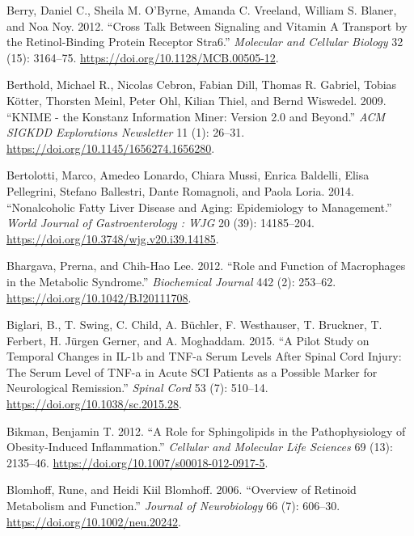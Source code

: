 \documentclass[9pt,lineno]{elife}
\newlength{\cslhangindent}
\newlength{\cslentryspacingunit} %
\newenvironment{CSLReferences}[2] %
 {%
  \setlength{\parindent}{0pt}
  \ifodd #1
  \let\oldpar\par
  \def\par{\hangindent=\cslhangindent\oldpar}
  \fi
  \setlength{\parskip}{#2\cslentryspacingunit}
 }%
 {}
\begin{document}
\begin{CSLReferences}{1}{0}
\leavevmode{}%
Berry, Daniel C., Sheila M. O'Byrne, Amanda C. Vreeland, William S. Blaner, and Noa Noy. 2012. {``Cross {Talk} Between {Signaling} and {Vitamin A Transport} by the {Retinol-Binding Protein Receptor Stra6}.''} \emph{Molecular and Cellular Biology} 32 (15): 3164--75. \url{https://doi.org/10.1128/MCB.00505-12}.

\leavevmode{}%
Berthold, Michael R., Nicolas Cebron, Fabian Dill, Thomas R. Gabriel, Tobias Kötter, Thorsten Meinl, Peter Ohl, Kilian Thiel, and Bernd Wiswedel. 2009. {``{KNIME} - the {Konstanz} Information Miner: Version 2.0 and Beyond.''} \emph{ACM SIGKDD Explorations Newsletter} 11 (1): 26--31. \url{https://doi.org/10.1145/1656274.1656280}.

\leavevmode{}%
Bertolotti, Marco, Amedeo Lonardo, Chiara Mussi, Enrica Baldelli, Elisa Pellegrini, Stefano Ballestri, Dante Romagnoli, and Paola Loria. 2014. {``Nonalcoholic Fatty Liver Disease and Aging: {Epidemiology} to Management.''} \emph{World Journal of Gastroenterology : WJG} 20 (39): 14185--204. \url{https://doi.org/10.3748/wjg.v20.i39.14185}.

\leavevmode{}%
Bhargava, Prerna, and Chih-Hao Lee. 2012. {``Role and Function of Macrophages in the Metabolic Syndrome.''} \emph{Biochemical Journal} 442 (2): 253--62. \url{https://doi.org/10.1042/BJ20111708}.

\leavevmode{}%
Biglari, B., T. Swing, C. Child, A. Büchler, F. Westhauser, T. Bruckner, T. Ferbert, H. Jürgen Gerner, and A. Moghaddam. 2015. {``A Pilot Study on Temporal Changes in {IL-1b} and {TNF-a} Serum Levels After Spinal Cord Injury: The Serum Level of {TNF-a} in Acute {SCI} Patients as a Possible Marker for Neurological Remission.''} \emph{Spinal Cord} 53 (7): 510--14. \url{https://doi.org/10.1038/sc.2015.28}.

\leavevmode{}%
Bikman, Benjamin T. 2012. {``A Role for Sphingolipids in the Pathophysiology of Obesity-Induced Inflammation.''} \emph{Cellular and Molecular Life Sciences} 69 (13): 2135--46. \url{https://doi.org/10.1007/s00018-012-0917-5}.

\leavevmode{}%
Blomhoff, Rune, and Heidi Kiil Blomhoff. 2006. {``Overview of Retinoid Metabolism and Function.''} \emph{Journal of Neurobiology} 66 (7): 606--30. \url{https://doi.org/10.1002/neu.20242}.


\end{CSLReferences}
\end{document}
